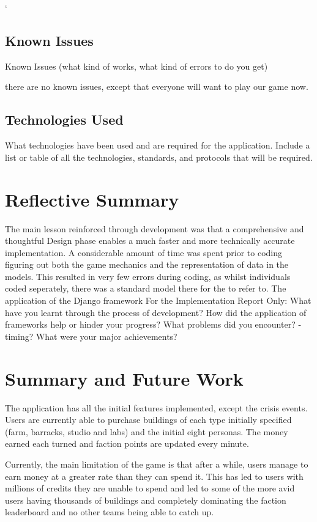 `\documentclass{sig-alt-release2}
\begin{document}
\subsection{Known Issues}

Known Issues (what kind of works, what kind of errors to do you get)

there are no known issues, except that everyone will want to play our game now.

\subsection{Technologies Used}

What technologies have been used and are required for the application. Include a list or table of all the technologies, standards, and protocols that will be required.

\section{Reflective Summary}

The main lesson reinforced through development was that a comprehensive and thoughtful Design phase enables a much faster and more technically accurate implementation. A considerable amount of time was spent prior to coding figuring out both the game mechanics and the representation of data in the models. This resulted in very few errors during coding, as whilst individuals coded seperately, there was a standard model there for the to refer to.
The application of the Django framework 
For the Implementation Report Only:
What have you learnt through the process of development? 
How did the application of frameworks help or hinder your progress?
What problems did you encounter? - timing?
What were your major achievements?


\section{Summary and Future Work}

The application has all the initial features implemented, except the crisis events. Users are currently able to purchase buildings of each type initially specified (farm, barracks, studio and labs) and the initial eight personas. The money earned each turned and faction points are updated every minute.

Currently, the main limitation of the game is that after a while, users manage to earn money at a greater rate than they can spend it. This has led to users with millions of credits they are unable to spend and led to some of the more avid users having thousands of buildings and completely dominating the faction leaderboard and no other teams being able to catch up.
\end{document}
